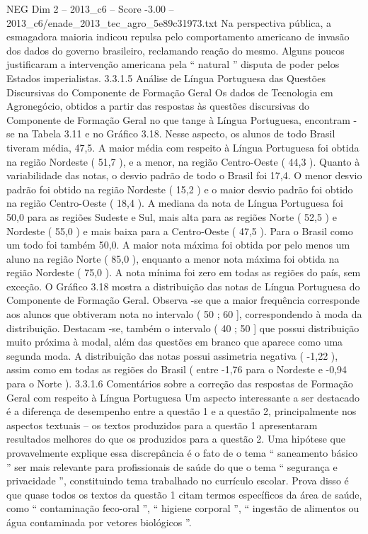 \begin{textsample}{NEG Dim 2 – 2013\_c6 – Score -3.00 – 2013\_c6/enade\_2013\_tec\_agro\_5e89c31973.txt}
Na perspectiva pública, a esmagadora maioria indicou repulsa pelo comportamento americano de invasão dos dados do governo brasileiro, reclamando reação do mesmo.
Alguns poucos justificaram a intervenção americana pela “ natural ” disputa de poder pelos Estados imperialistas. 3.3.1.5 Análise de Língua Portuguesa das Questões Discursivas do Componente de Formação Geral Os dados de Tecnologia em Agronegócio, obtidos a partir das respostas às questões discursivas do Componente de Formação Geral no que tange à Língua Portuguesa, encontram -se na Tabela 3.11 e no Gráfico 3.18.
Nesse aspecto, os alunos de todo Brasil tiveram média, 47,5.
A maior média com respeito à Língua Portuguesa foi obtida na região Nordeste ( 51,7 ), e a menor, na região Centro-Oeste ( 44,3 ).
Quanto à variabilidade das notas, o desvio padrão de todo o Brasil foi 17,4.
O menor desvio padrão foi obtido na região Nordeste ( 15,2 ) e o maior desvio padrão foi obtido na região Centro-Oeste ( 18,4 ).
A mediana da nota de Língua Portuguesa foi 50,0 para as regiões Sudeste e Sul, mais alta para as regiões Norte ( 52,5 ) e Nordeste ( 55,0 ) e mais baixa para a Centro-Oeste ( 47,5 ).
Para o Brasil como um todo foi também 50,0.
A maior nota máxima foi obtida por pelo menos um aluno na região Norte ( 85,0 ), enquanto a menor nota máxima foi obtida na região Nordeste ( 75,0 ).
A nota mínima foi zero em todas as regiões do país, sem exceção.
O Gráfico 3.18 mostra a distribuição das notas de Língua Portuguesa do Componente de Formação Geral.
Observa -se que a maior frequência corresponde aos alunos que obtiveram nota no intervalo ( 50 ; 60 ], correspondendo à moda da distribuição.
Destacam -se, também o intervalo ( 40 ; 50 ] que possui distribuição muito próxima à modal, além das questões em branco que aparece como uma segunda moda.
A distribuição das notas possui assimetria negativa ( -1,22 ), assim como em todas as regiões do Brasil ( entre -1,76 para o Nordeste e -0,94 para o Norte ). 3.3.1.6 Comentários sobre a correção das respostas de Formação Geral com respeito à Língua Portuguesa Um aspecto interessante a ser destacado é a diferença de desempenho entre a questão 1 e a questão 2, principalmente nos aspectos textuais – os textos produzidos para a questão 1 apresentaram resultados melhores do que os produzidos para a questão 2.
Uma hipótese que provavelmente explique essa discrepância é o fato de o tema “ saneamento básico ” ser mais relevante para profissionais de saúde do que o tema “ segurança e privacidade ”, constituindo tema trabalhado no currículo escolar.
Prova disso é que quase todos os textos da questão 1 citam termos específicos da área de saúde, como “ contaminação feco-oral ”, “ higiene corporal ”, “ ingestão de alimentos ou água contaminada por vetores biológicos ”.

\end{textsample}
